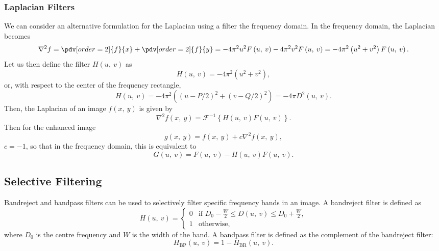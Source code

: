 \documentclass{article}
\begin{document}
\subsubsection{Laplacian Filters}
We can consider an alternative formulation for the Laplacian using a
filter the frequency domain. In the frequency domain, the Laplacian
becomes
\begin{equation*}
    \nabla^2 f = \pdv[order=2]{f}{x} + \pdv[order=2]{f}{y} = -4\pi^2 u^2 F\left( u,\: v \right) - 4\pi^2 v^2 F\left( u,\: v \right) = -4\pi^2 \left( u^2 + v^2 \right) F\left( u,\: v \right).
\end{equation*}
Let us then define the filter \(H\left( u,\: v \right)\) as
\begin{equation*}
    H\left( u,\: v \right) = -4 \pi^2 \left( u^2 + v^2 \right),
\end{equation*}
or, with respect to the center of the frequency rectangle,
\begin{equation*}
    H\left( u,\: v \right) = -4 \pi^2 \left( \left( u - P/2 \right)^2 + \left( v - Q/2 \right)^2 \right) = -4\pi D^2\left( u,\: v \right).
\end{equation*}
Then, the Laplacian of an image \(f\left( x,\: y \right)\) is given by
\begin{equation*}
    \nabla^2 f\left( x,\: y \right) = \mathscr{F}^{-1}\left\{ H\left( u,\: v \right) F\left( u,\: v \right) \right\}.
\end{equation*}
Then for the enhanced image
\begin{equation*}
    g\left( x,\: y \right) = f\left( x,\: y \right) + c \nabla^2 f\left( x,\: y \right),
\end{equation*}
\(c = -1\), so that in the frequency domain, this is equivalent to
\begin{equation*}
    G\left( u,\: v \right) = F\left( u,\: v \right) - H\left( u,\: v \right) F\left( u,\: v \right).
\end{equation*}
\subsection{Selective Filtering}
Bandreject and bandpass filters can be used to selectively filter
specific frequency bands in an image. A bandreject filter is defined as
\begin{equation*}
    H\left( u,\: v \right) =
    \begin{cases}
        0 & \text{if } D_0 - \frac{W}{2} \leq D\left( u,\: v \right) \leq D_0 + \frac{W}{2}, \\
        1 & \text{otherwise},
    \end{cases}
\end{equation*}
where \(D_0\) is the centre frequency and \(W\) is the width of the
band. A bandpass filter is defined as the complement of the bandreject
filter:
\begin{equation*}
    H_{\text{BP}}\left( u,\: v \right) = 1 - H_{\text{BR}}\left( u,\: v \right).
\end{equation*}
\end{document}
